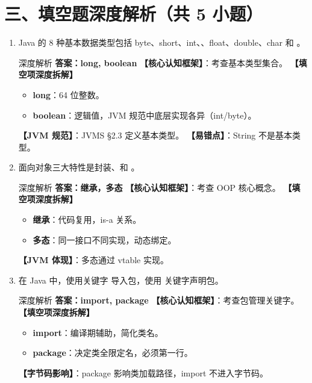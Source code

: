 ﻿\documentclass[12pt, a4paper]{ctexart}
\newcommand{\blank}{\underline{\hspace{2em}}}
\begin{document}
\section*{三、填空题深度解析（共 5 小题）}

\begin{enumerate}[label=\textbf{\arabic*.}, itemsep=1em]
	\item Java 的 8 种基本数据类型包括 byte、short、int、\blank、float、double、char 和 \blank。
	      \begin{bluebox}{深度解析}
		      \textbf{答案：long, boolean}
		      \textbf{【核心认知框架】}：考查基本类型集合。
		      \textbf{【填空项深度拆解】}
		      \begin{itemize}[leftmargin=*, nosep]
			      \item \textbf{long}：64 位整数。
			      \item \textbf{boolean}：逻辑值，JVM 规范中底层实现各异（int/byte）。
		      \end{itemize}
		      \textbf{【JVM 规范】}：JVMS §2.3 定义基本类型。
		      \textbf{【易错点】}：String 不是基本类型。
	      \end{bluebox}

	\item 面向对象三大特性是封装、\blank 和 \blank。
	      \begin{bluebox}{深度解析}
		      \textbf{答案：继承，多态}
		      \textbf{【核心认知框架】}：考查 OOP 核心概念。
		      \textbf{【填空项深度拆解】}
		      \begin{itemize}[leftmargin=*, nosep]
			      \item \textbf{继承}：代码复用，is-a 关系。
			      \item \textbf{多态}：同一接口不同实现，动态绑定。
		      \end{itemize}
		      \textbf{【JVM 体现】}：多态通过 vtable 实现。
	      \end{bluebox}

	\item 在 Java 中，使用关键字 \blank 导入包，使用 \blank 关键字声明包。
	      \begin{bluebox}{深度解析}
		      \textbf{答案：import, package}
		      \textbf{【核心认知框架】}：考查包管理关键字。
		      \textbf{【填空项深度拆解】}
		      \begin{itemize}[leftmargin=*, nosep]
			      \item \textbf{import}：编译期辅助，简化类名。
			      \item \textbf{package}：决定类全限定名，必须第一行。
		      \end{itemize}
		      \textbf{【字节码影响】}：package 影响类加载路径，import 不进入字节码。
	      \end{bluebox}


\end{enumerate}
\end{document}
